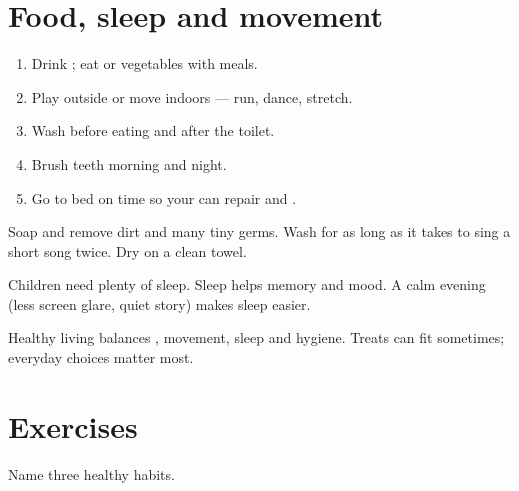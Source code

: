 \section{Food, sleep and movement}

\begin{method}\label{met:g2:healthy:day}
\begin{enumerate}
  \item Drink ; eat  or vegetables with meals.
  \item Play outside or move indoors --- run, dance, stretch.
  \item Wash  before eating and after the toilet.
  \item Brush teeth morning and night.
  \item Go to bed on time so your  can repair and .
\end{enumerate}
\end{method}

\begin{example}\label{ex:g2:healthy:hands}
Soap and  remove dirt and many tiny germs. Wash for as long as
it takes to sing a short song twice. Dry on a clean towel.
\end{example}

\begin{example}[Sleep]\label{ex:g2:healthy:sleep}
Children need plenty of sleep. Sleep helps memory and mood. A calm
evening (less screen glare, quiet story) makes sleep easier.
\end{example}

\begin{proposition}[Balance]\label{prop:g2:healthy:balance}
Healthy living balances , movement, sleep and hygiene. Treats
can fit sometimes; everyday choices matter most.
\end{proposition}
\admitted

\section{Exercises}

\begin{exercise}[$\star$]\label{exo:g2:healthy:1}
Name three healthy habits.
\end{exercise}

